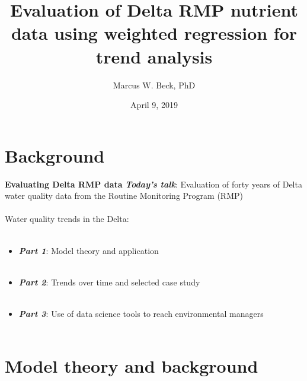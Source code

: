 \documentclass[serif]{beamer}\usepackage[]{graphicx}\usepackage[]{color}
\newcommand{\emtxt}[1]{\textbf{\textit{#1}}}
\begin{document}
\title[Evaluation of Delta RMP data]{\textbf{Evaluation of Delta RMP nutrient data using weighted regression for trend analysis}}
\author[M. Beck]{Marcus W. Beck, PhD}


\date{April 9, 2019}


\begin{frame}[shrink]
\vspace{0.2in}
\titlepage
\end{frame}

\section{Background}

\begin{frame}{\textbf{Evaluating Delta RMP data}}{}
\onslide<+->
\emtxt{Today's talk}: Evaluation of forty years of Delta water quality data from the Routine Monitoring Program (RMP) \\~\\
\onslide<+->
Water quality trends in the Delta: \\~\\
\begin{itemize}
\item \emtxt{Part 1}: Model theory and application \\~\\
\item \emtxt{Part 2}: Trends over time and selected case study \\~\\
\item \emtxt{Part 3}: Use of data science tools to reach environmental managers \\~\\
\end{itemize}
\end{frame}

\section{Model theory and background}
\end{document}
